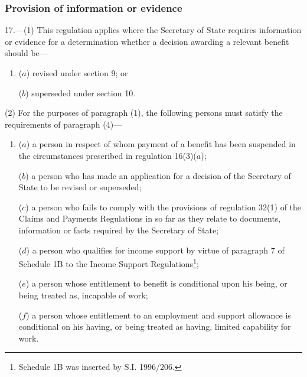 \documentclass[12pt,a4paper]{article}
\begin{document}

\subsubsection[17. Provision of information or evidence]{Provision of information or evidence}

17.—(1) This regulation applies where the Secretary of State requires information or evidence for a determination whether a decision awarding a relevant benefit should be—
\begin{enumerate}\item[]
($a$) revised under section 9; or

($b$) superseded under section 10.
\end{enumerate}

(2) For the purposes of paragraph (1), the following persons must satisfy the requirements of paragraph (4)—
\begin{enumerate}\item[]
($a$) a person in respect of whom payment of a benefit has been suspended in the circumstances prescribed in regulation 16(3)($a$);

($b$) a person who has made an application for a decision of the Secretary of State to be revised or superseded;

($c$) a person who fails to comply with the provisions of regulation 32(1) of the Claims and Payments Regulations in so far as they relate to documents, information or facts required by the Secretary of State;

($d$) a person who qualifies for income support by virtue of paragraph 7 of Schedule 1B to the Income Support Regulations\footnote{\frenchspacing Schedule 1B was inserted by S.I. 1996/206.};

($e$) a person whose entitlement to benefit is conditional upon his being, or being treated as, incapable of work;

($f$) a person whose entitlement to an employment and support allowance is conditional on his having, or being treated as having, limited capability for work.
\end{enumerate}
\end{document}

